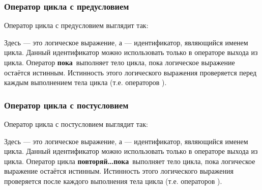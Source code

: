 \documentclass[10pt]{report}
\begin{document}
        \subsubsection{Оператор цикла с предусловием}
Оператор цикла с предусловием выглядит так:
\begin{center}
\textcolor{Green}{}
\end{center}
Здесь \textcolor{Green}{} --- это логическое выражение, а  \textcolor{Green}{} --- идентификатор, являющийся именем цикла.
Данный идентификатор можно использовать только в операторе выхода из цикла. Оператор \textbf{\glqq пока\grqq}\ выполняет тело цикла, пока логическое выражение
\textcolor{Green}{} остаётся истинным. Истинность этого логического выражения проверяется перед каждым выполнением тела цикла (т.е.
операторов \textcolor{Green}{}).
        \subsubsection{Оператор цикла с постусловием}
Оператор цикла с постусловием выглядит так:
\begin{center}
\textcolor{Green}{}
\end{center}
Здесь \textcolor{Green}{} --- это логическое выражение, а  \textcolor{Green}{} --- идентификатор, являющийся именем цикла.
Данный идентификатор можно использовать только в операторе выхода из цикла. Оператор цикла \textbf{\glqq повторяй\dots пока\grqq}\ выполняет тело цикла, пока логическое
выражение \textcolor{Green}{} остаётся истинным. Истинность этого логического выражения проверяется после каждого выполнения тела цикла (т.е.
операторов \textcolor{Green}{}).
\end{document}
